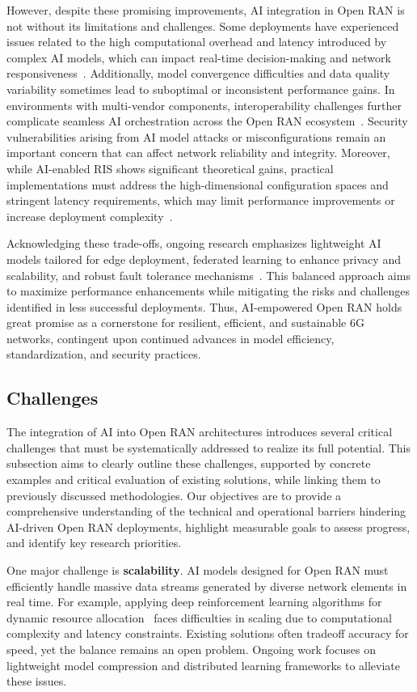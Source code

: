 \documentclass[sigconf]{acmart}
\begin{document}
However, despite these promising improvements, AI integration in Open RAN is not without its limitations and challenges. Some deployments have experienced issues related to the high computational overhead and latency introduced by complex AI models, which can impact real-time decision-making and network responsiveness~\cite{ref54}. Additionally, model convergence difficulties and data quality variability sometimes lead to suboptimal or inconsistent performance gains. In environments with multi-vendor components, interoperability challenges further complicate seamless AI orchestration across the Open RAN ecosystem~\cite{ref54}. Security vulnerabilities arising from AI model attacks or misconfigurations remain an important concern that can affect network reliability and integrity. Moreover, while AI-enabled RIS shows significant theoretical gains, practical implementations must address the high-dimensional configuration spaces and stringent latency requirements, which may limit performance improvements or increase deployment complexity~\cite{ref49}.

Acknowledging these trade-offs, ongoing research emphasizes lightweight AI models tailored for edge deployment, federated learning to enhance privacy and scalability, and robust fault tolerance mechanisms~\cite{ref54}. This balanced approach aims to maximize performance enhancements while mitigating the risks and challenges identified in less successful deployments. Thus, AI-empowered Open RAN holds great promise as a cornerstone for resilient, efficient, and sustainable 6G networks, contingent upon continued advances in model efficiency, standardization, and security practices.

\subsection{Challenges}
The integration of AI into Open RAN architectures introduces several critical challenges that must be systematically addressed to realize its full potential. This subsection aims to clearly outline these challenges, supported by concrete examples and critical evaluation of existing solutions, while linking them to previously discussed methodologies. Our objectives are to provide a comprehensive understanding of the technical and operational barriers hindering AI-driven Open RAN deployments, highlight measurable goals to assess progress, and identify key research priorities.

One major challenge is \textbf{scalability}. AI models designed for Open RAN must efficiently handle massive data streams generated by diverse network elements in real time. For example, applying deep reinforcement learning algorithms for dynamic resource allocation~\cite{ref1} faces difficulties in scaling due to computational complexity and latency constraints. Existing solutions often tradeoff accuracy for speed, yet the balance remains an open problem. Ongoing work focuses on lightweight model compression and distributed learning frameworks to alleviate these issues.
\end{document}

